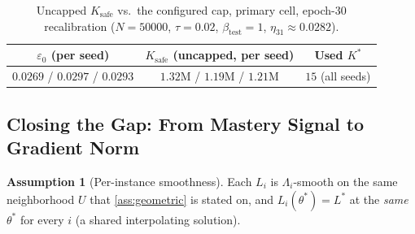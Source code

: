 \documentclass{article}
\theoremstyle{plain}
\theoremstyle{definition}
\newtheorem{assumption}[theorem]{Assumption}
\theoremstyle{remark}
\begin{document}
\begin{table}[h]
\caption{Uncapped $K_{\mathrm{safe}}$ vs.\ the configured cap, primary cell, epoch-30 recalibration ($N{=}50000$, $\tau{=}0.02$, $\beta_{\mathrm{test}}{=}1$, $\eta_{31}{\approx}0.0282$).}
\label{tab:ksafe}
\centering
\small
\begin{tabular}{ccc}
\toprule
$\varepsilon_0$ (per seed) & $K_{\mathrm{safe}}$ (uncapped, per seed) & Used $K^*$ \\
\midrule
$0.0269$ / $0.0297$ / $0.0293$ & $1.32$M / $1.19$M / $1.21$M & $15$ (all seeds) \\
\bottomrule
\end{tabular}
\end{table}

\subsection{Closing the Gap: From Mastery Signal to Gradient Norm}
\label{sec:bridge}

\begin{assumption}[Per-instance smoothness]
\label{ass:smoothi}
Each $L_i$ is $\Lambda_i$-smooth on the same neighborhood $U$ that \cref{ass:geometric} is stated on, and $L_i(\theta^*)=L^*$ at the \emph{same} $\theta^*$ for every $i$ (a shared interpolating solution).
\end{assumption}
\end{document}

